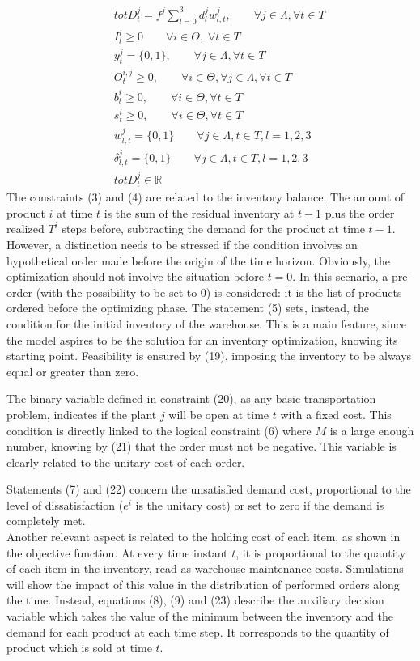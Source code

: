 \documentclass{article}
\begin{document}
\begin{eqnarray}
&& totD^j_t = f^j\sum_{l=0}^3 d^j_l w^j_{l,t}, \qquad \forall j \in \Lambda, \forall t  \in T\\
&& I_t^i \geq 0 \qquad \forall i \in \Theta,\; \forall t \in T \label{EQPB:general_inventory} \\
&& y_t^j =\{0,1\}, \qquad \forall j \in \Lambda, \forall t \in T \label{EQPB:supplier}\\
&& O_t^{i,j} \geq 0, \qquad \forall i \in \Theta, \forall j \in \Lambda, \forall t  \in T \label{EQPB:amount}\\
&& b_t^{i} \geq 0, \qquad \forall i \in \Theta,  \forall t  \in T \label{EQPB:b0}\\
&& s_t^i \geq 0, \qquad \forall i \in \Theta,  \forall t  \in T\\
&& w_{l,t}^j = \{0,1\} \qquad \forall j \in \Lambda, t \in T, l=1,2,3\\
&& \delta_{l,t}^j=\{0,1\} \qquad \forall j \in \Lambda, t \in T, l=1,2,3\\
&& totD_t^j \in \mathbb{R}
\end{eqnarray}
\noindent
\newpage
The constraints (3) and (4) are related to the inventory balance. The amount of product $i$ at time $t$ is the sum of the residual inventory at $t-1$ plus the order realized $T^i$ steps before, subtracting the demand for the product at time $t-1$. However, a distinction needs to be stressed if the condition involves an hypothetical order made before the origin of the time horizon. Obviously, the optimization should not involve the situation before $t=0$. In this scenario, a pre-order (with the possibility to be set to 0) is considered: it is the list of products ordered before the optimizing phase. The statement (5) sets, instead, the condition for the initial inventory of the warehouse. This is a main feature, since the model aspires to be the solution for an inventory optimization, knowing its starting point. Feasibility is ensured by (19), imposing the inventory to be always equal or greater than zero. \par
The binary variable defined in constraint (20), as any basic transportation problem, indicates if the plant $j$ will be open at time $t$ with a fixed cost. This condition is directly linked to the logical constraint (6) where $M$ is a large enough number, knowing by (21) that the order must not be negative. This variable is clearly related to the unitary cost of each order. \par
Statements (7) and (22) concern the unsatisfied demand cost, proportional to the level of dissatisfaction ($e^i$ is the unitary cost) or set to zero if the demand is completely met. \\ Another relevant aspect is related to the holding cost of each item, as shown in the objective function. At every time instant $t$, it is proportional to the quantity of each item in the inventory, read as warehouse maintenance costs. Simulations will show the impact of this value in the distribution of performed orders along the time. Instead, equations (8), (9) and (23) describe the auxiliary decision variable which takes the value of the minimum between the inventory and the demand for each product at each time step. It corresponds to the quantity of product which is sold at time $t$. \par
\end{document}
